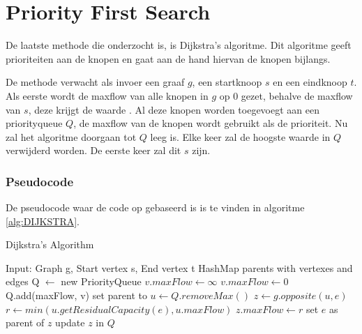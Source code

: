 \chapter{Priority First Search}
\label{chap:priorityfirst}

De laatste methode die onderzocht is, is Dijkstra's algoritme. Dit algoritme geeft prioriteiten aan de knopen en gaat aan de hand hiervan de knopen bijlangs.

De methode verwacht als invoer een graaf $g$, een startknoop $s$ en een eindknoop $t$.
Als eerste wordt de maxflow van alle knopen in $g$ op 0 gezet, behalve de maxflow van $s$, deze krijgt de waarde \infty. Al deze knopen worden toegevoegt aan een priorityqueue $Q$, de maxflow van de knopen wordt gebruikt als de prioriteit.
Nu zal het algoritme doorgaan tot $Q$ leeg is. Elke keer zal de hoogste waarde in $Q$ verwijderd worden. De eerste keer zal dit $s$ zijn.

\subsection{Pseudocode}
De pseudocode waar de code op gebaseerd is is te vinden in algoritme \ref{alg:DIJKSTRA}.

\begin{algorithm}[h]
\caption{Dijkstra's Algorithm}
\label{alg:DIJKSTRA}
\begin{algorithmic}
\REQUIRE Input: Graph g, Start vertex s, End vertex t
\STATE HashMap parents with vertexes and edges
\STATE Q $\gets$ new PriorityQueue
\STATE $v.maxFlow \gets \infty$
\ELSE
\STATE $v.maxFlow \gets 0$
\ENDIF
\STATE Q.add(maxFlow, v)
\STATE set parent to \emptyset
\ENDFOR
{}
\STATE $u \gets Q.removeMax()$
\STATE $z \gets g.opposite(u, e)$
\STATE $r \gets min(u.getResidualCapacity(e), u.maxFlow)$
\STATE $z.maxFlow \gets r$
\STATE set $e$ as parent of $z$
\STATE update $z$ in $Q$
\ENDIF
\ENDFOR
\ENDWHILE
\end{algorithmic}
\end{algorithm}